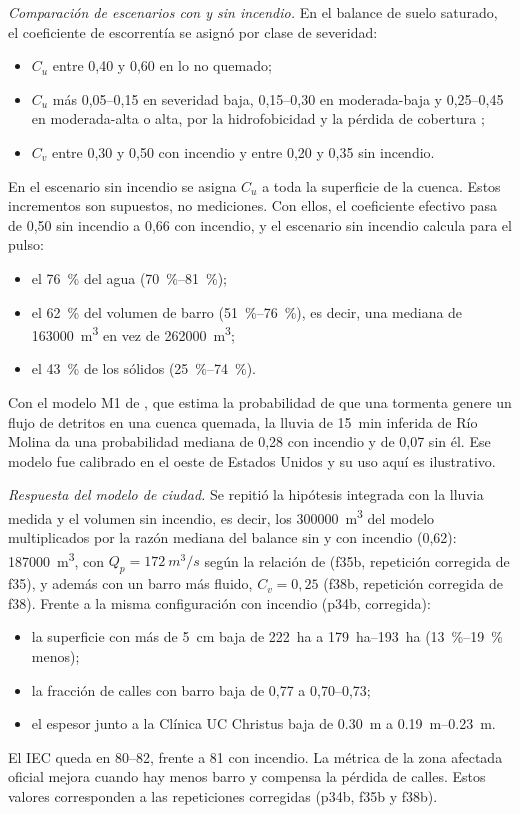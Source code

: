 \emph{Comparación de escenarios con y sin incendio.} En el balance de suelo saturado, el coeficiente de escorrentía se asignó por clase de severidad:
\begin{itemize}
\item $C_u$ entre 0,40 y 0,60 en lo no quemado;
\item $C_u$ más 0,05--0,15 en severidad baja, 0,15--0,30 en moderada-baja y 0,25--0,45 en moderada-alta o alta, por la hidrofobicidad y la pérdida de cobertura \citep{moody2013};
\item $C_v$ entre 0,30 y 0,50 con incendio y entre 0,20 y 0,35 sin incendio.
\end{itemize}
En el escenario sin incendio se asigna $C_u$ a toda la superficie de la cuenca. Estos incrementos son supuestos, no mediciones. Con ellos, el coeficiente efectivo pasa de 0,50 sin incendio a 0,66 con incendio, y el escenario sin incendio calcula para el pulso:
\begin{itemize}
\item el \SI{76}{\percent} del agua (\SIrange{70}{81}{\percent});
\item el \SI{62}{\percent} del volumen de barro (\SIrange{51}{76}{\percent}), es decir, una mediana de \SI{163000}{m^3} en vez de \SI{262000}{m^3};
\item el \SI{43}{\percent} de los sólidos (\SIrange{25}{74}{\percent}).
\end{itemize}
Con el modelo M1 de \citet{staley2017}, que estima la probabilidad de que una tormenta genere un flujo de detritos en una cuenca quemada, la lluvia de \SI{15}{min} inferida de Río Molina da una probabilidad mediana de 0,28 con incendio y de 0,07 sin él. Ese modelo fue calibrado en el oeste de Estados Unidos y su uso aquí es ilustrativo.

\emph{Respuesta del modelo de ciudad.} Se repitió la hipótesis integrada con la lluvia medida y el volumen sin incendio, es decir, los \SI{300000}{m^3} del modelo multiplicados por la razón mediana del balance sin y con incendio (0,62): \SI{187000}{m^3}, con $Q_p=\SI{172}{m^3/s}$ según la relación de \citet{mizuyama1992} (f35b, repetición corregida de f35), y además con un barro más fluido, $C_v=0{,}25$ (f38b, repetición corregida de f38). Frente a la misma configuración con incendio (p34b, corregida):
\begin{itemize}
\item la superficie con más de \SI{5}{cm} baja de \SI{222}{ha} a \SIrange{179}{193}{ha} (\SIrange{13}{19}{\percent} menos);
\item la fracción de calles con barro baja de 0,77 a 0,70--0,73;
\item el espesor junto a la Clínica UC Christus baja de \SI{0,30}{m} a \SIrange{0,19}{0,23}{m}.
\end{itemize}
El IEC queda en 80--82, frente a 81 con incendio. La métrica de la zona afectada oficial mejora cuando hay menos barro y compensa la pérdida de calles. Estos valores corresponden a las repeticiones corregidas (p34b, f35b y f38b).

